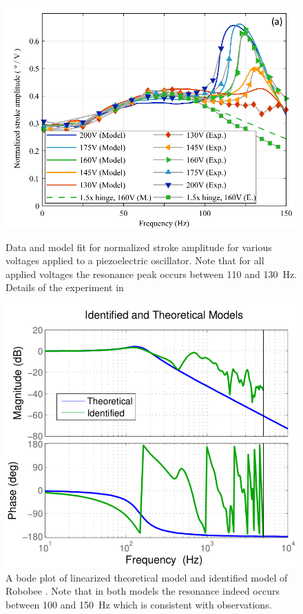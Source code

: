 \begin{figure}
\centering
{}
\includegraphics[width=\textwidth]{Files/Figures/resonance.png}
\caption[Resonance of the piezoelectric oscillator]{ Data and model fit for normalized stroke amplitude for various voltages applied to a piezoelectric oscillator. Note that for all applied voltages the resonance peak occurs between 110 and 130~Hz. Details of the experiment in \cite{Jafferis2016}}
\label{fig:resonance}
\endminipage\hfill
{}
\includegraphics[width=\textwidth]{Files/Figures/sysid.png}
\caption[Bode plot of linearized Robobee model]{A bode plot of linearized theoretical model and identified model of Robobee \cite{Finio2011}. Note that in both models the resonance indeed occurs between 100 and 150~Hz which is consistent with observations.}
\label{fig:sysid}
\endminipage\hfill
\end{figure}


